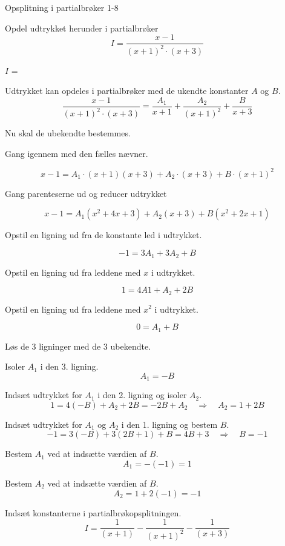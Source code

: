 \documentclass{article}
\begin{document}
\begin{exercise}{Opsplitning i partialbrøker 1-8}

Opdel udtrykket herunder i partialbrøker
\[
I = \frac{x - 1}{(x + 1)^2 \cdot (x + 3)}
\]

$I$ = 

\hint
Udtrykket kan opdeles i partialbrøker med de ukendte konstanter $A$ og $B$.
\[
\frac{x - 1}{(x + 1)^2 \cdot (x + 3)} =
\frac{A_1}{x + 1} + \frac{A_2}{(x + 1)^2} + \frac{B}{x + 3}
\]

\hint
Nu skal de ubekendte bestemmes.

\hint
Gang igennem med den fælles nævner.

\hint
\[
x - 1 = A_1 \cdot (x + 1)(x + 3) + A_2 \cdot (x + 3) + B \cdot (x + 1)^2
\]

\hint
Gang parenteserne ud og reducer udtrykket

\hint
\[
x - 1 = A_1(x^2 + 4x + 3) + A_2(x + 3) + B(x^2 + 2x + 1)
\]

\hint
Opstil en ligning ud fra de konstante led i udtrykket.

\hint
\[
-1 = 3A_1 + 3A_2 + B
\]

\hint
Opstil en ligning ud fra leddene med $x$ i udtrykket.

\hint
\[
1 = 4A1 + A_2 + 2B
\]

\hint
Opstil en ligning ud fra leddene med $x^2$ i udtrykket.

\hint
\[
0 = A_1 + B
\]

\hint
Løs de 3 ligninger med de 3 ubekendte.

\hint
Isoler $A_1$ i den 3. ligning.
\[
A_1 = -B
\]

\hint
Indsæt udtrykket for $A_1$ i den 2. ligning og isoler $A_2$.
\[
1 = 4(-B) + A_2 + 2B = -2B + A_2 \quad\Rightarrow \quad A_2 = 1 + 2B
\]

\hint
Indsæt udtrykket for $A_1$ og $A_2$ i den 1. ligning og bestem $B$.
\[
-1= 3(-B) + 3(2B + 1) + B = 4B + 3\quad \Rightarrow \quad B = -1
\]

\hint
Bestem $A_1$ ved at indsætte værdien af $B$.
\[
A_1 = - (-1) = 1
\]

\hint
Bestem $A_2$ ved at indsætte værdien af $B$.
\[
A_2 = 1 + 2(-1) = -1
\]

\hint
Indsæt konstanterne i partialbrøkopsplitningen.
\[
I = \frac{1}{(x + 1)} - \frac{1}{(x + 1)^2} - \frac{1}{(x + 3)}
\]



\end{exercise}
\end{document}
